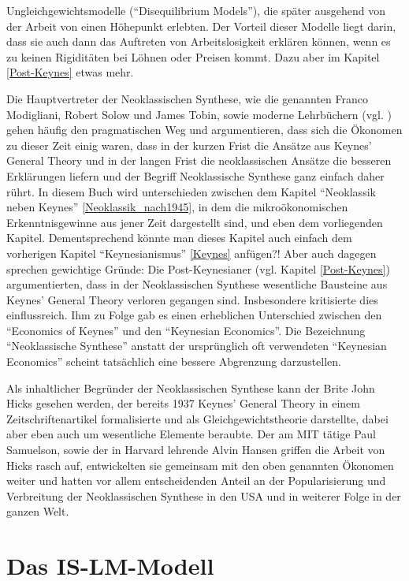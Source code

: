 Ungleichgewichtsmodelle ("`Disequilibrium Models"'), die später ausgehend von der Arbeit von \textcite{Leijonhufvud1968} einen Höhepunkt erlebten. Der Vorteil dieser Modelle liegt darin, dass sie auch dann das Auftreten von Arbeitslosigkeit erklären können, wenn es zu keinen Rigiditäten bei Löhnen oder Preisen kommt. Dazu aber im Kapitel \ref{Post-Keynes} etwas mehr.

Die Hauptvertreter der Neoklassischen Synthese, wie die genannten Franco Modigliani, Robert Solow und James Tobin, sowie moderne Lehrbüchern (vgl. \textcite{DeVroey2013}) gehen häufig den pragmatischen Weg und argumentieren, dass sich die Ökonomen zu dieser Zeit einig waren, dass in der kurzen Frist die Ansätze aus Keynes' General Theory und in der langen Frist die neoklassischen Ansätze die besseren Erklärungen liefern und der Begriff Neoklassische Synthese ganz einfach daher rührt. In diesem Buch wird unterschieden zwischen dem Kapitel "`Neoklassik neben Keynes"' \ref{Neoklassik_nach1945}, in dem die mikroökonomischen Erkenntnisgewinne aus jener Zeit dargestellt sind, und eben dem vorliegenden Kapitel. Dementsprechend könnte man dieses Kapitel auch einfach dem vorherigen Kapitel "`Keynesianismus"' \ref{Keynes} anfügen?! Aber auch dagegen sprechen gewichtige Gründe: Die Post-Keynesianer (vgl. Kapitel \ref{Post-Keynes}) argumentierten, dass in der Neoklassischen Synthese wesentliche Bausteine aus Keynes' General Theory verloren gegangen sind. Insbesondere \textcite{Leijonhufvud1968} kritisierte dies einflussreich. Ihm zu Folge gab es einen erheblichen Unterschied zwischen den "`Economics of Keynes"' und den "`Keynesian Economics"'. Die Bezeichnung "`Neoklassische Synthese"' anstatt der ursprünglich oft verwendeten "`Keynesian Economics"' scheint tatsächlich eine bessere Abgrenzung darzustellen.

Als inhaltlicher Begründer der Neoklassischen Synthese kann der Brite John Hicks gesehen werden, der bereits 1937 Keynes' General Theory in einem Zeitschriftenartikel formalisierte und als Gleichgewichtstheorie darstellte, dabei aber eben auch um wesentliche Elemente beraubte. Der am MIT tätige Paul Samuelson, sowie der in Harvard lehrende Alvin Hansen griffen die Arbeit von Hicks rasch auf, entwickelten sie gemeinsam mit den oben genannten Ökonomen weiter und hatten vor allem entscheidenden Anteil an der Popularisierung und Verbreitung der Neoklassischen Synthese in den USA und in weiterer Folge in der ganzen Welt.

\section{Das IS-LM-Modell}

